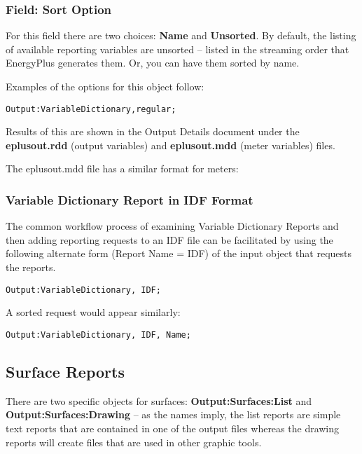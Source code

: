 \subsubsection{Field: Sort Option}\label{field-sort-option}

For this field there are two choices: \textbf{Name} and \textbf{Unsorted}. By default, the listing of available reporting variables are unsorted -- listed in the streaming order that EnergyPlus generates them. Or, you can have them sorted by name.

Examples of the options for this object follow:

\begin{lstlisting}
Output:VariableDictionary,regular;
\end{lstlisting}

Results of this are shown in the Output Details document under the \textbf{eplusout.rdd} (output variables) and \textbf{eplusout.mdd} (meter variables) files.

The eplusout.mdd file has a similar format for meters:

\subsubsection{Variable Dictionary Report in IDF Format}\label{variable-dictionary-report-in-idf-format}

The common workflow process of examining Variable Dictionary Reports and then adding reporting requests to an IDF file can be facilitated by using the following alternate form (Report Name = IDF) of the input object that requests the reports.

\begin{lstlisting}
Output:VariableDictionary, IDF;
\end{lstlisting}

A sorted request would appear similarly:

\begin{lstlisting}
Output:VariableDictionary, IDF, Name;
\end{lstlisting}

\subsection{Surface Reports}\label{surface-reports}

There are two specific objects for surfaces: \textbf{Output:Surfaces:List} and \textbf{Output:Surfaces:Drawing} -- as the names imply, the list reports are simple text reports that are contained in one of the output files whereas the drawing reports will create files that are used in other graphic tools.

